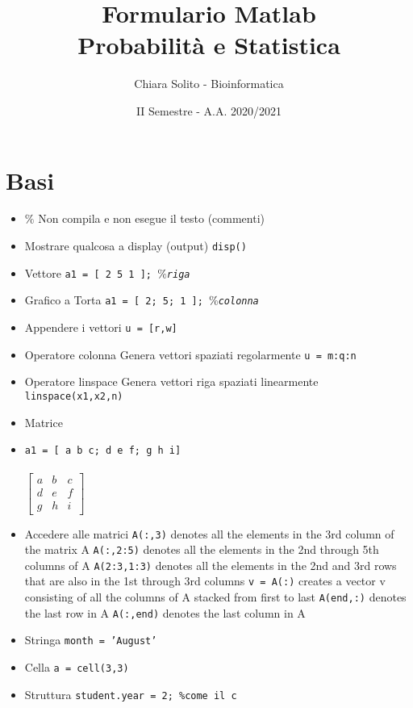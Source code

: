 \documentclass{article}
\begin{document}
\title{Formulario Matlab\\Probabilità e Statistica}
\author{Chiara Solito - Bioinformatica}
\date{II Semestre - A.A. 2020/2021}
\maketitle
\section{Basi}
\begin{itemize}
    \item $\%$
    \subitem Non compila e non esegue il testo (commenti)
    \item Mostrare qualcosa a display (output)
    \subitem \texttt{disp()}
    \item Vettore
    \subitem \texttt{a1 = [ 2 5 1 ]; $\%$\textit{riga}}
    \item Grafico a Torta
    \subitem \texttt{a1 = [ 2; 5; 1 ]; $\%$\textit{colonna}}
    \item Appendere i vettori
    \subitem \texttt{u = [r,w]}
    \item Operatore colonna
    \subitem Genera vettori spaziati regolarmente
    \subitem \texttt{u = m:q:n}
    \item Operatore linspace
    \subitem Genera vettori riga spaziati linearmente 
    \subitem \texttt{linspace(x1,x2,n)}
    \item Matrice
    \item \texttt{a1 = [ a b c; d e f; g h i]}\\
    \\
    $\begin{bmatrix}
        a & b & c\\
        d & e & f\\
        g & h & i
    \end{bmatrix}$
    \item Accedere alle matrici
    \subitem \texttt{A(:,3)} denotes all the elements in the 3rd column of the matrix A
    \subitem \texttt{A(:,2:5)} denotes all the elements in the 2nd through 5th columns of A
    \subitem \texttt{A(2:3,1:3)} denotes all the elements in the 2nd and 3rd rows that are also in the 1st through 3rd columns
    \subitem \texttt{v = A(:)} creates a vector v consisting of all the columns of A stacked from first to last
    \subitem \texttt{A(end,:)} denotes the last row in A
    \subitem \texttt{A(:,end)} denotes the last column in A
    \item Stringa
    \subitem \texttt{month = 'August'}
    \item Cella 
    \subitem \texttt{a = cell(3,3)}
    \item Struttura
    \subitem \texttt{student.year = 2; \%come il c}
\end{itemize}
\end{document}
